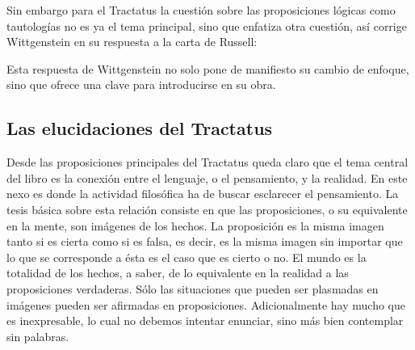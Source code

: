 Sin embargo para el Tractatus la cuestión sobre las proposiciones lógicas como
tautologías no es ya el tema principal, sino que enfatiza otra cuestión, así
corrige Wittgenstein en su respuesta a la carta de Russell:

Esta respuesta de Wittgenstein no solo pone de manifiesto su cambio de enfoque,
sino que ofrece una clave para introducirse en su obra. 


\subsection{Las elucidaciones del Tractatus}
Desde las proposiciones principales del Tractatus queda claro que el tema
central del libro es la conexión entre el lenguaje, o el pensamiento, y la
realidad.  
En este nexo es donde la actividad filosófica ha de buscar esclarecer el
pensamiento.
La tesis básica sobre esta relación consiste en que las proposiciones, o su
equivalente en la mente, son imágenes de los hechos.
La proposición es la misma imagen tanto si es cierta como si es falsa, es decir,
es la misma imagen sin importar que lo que se corresponde a ésta es el caso que
es cierto o no. El mundo es la totalidad de los hechos, a saber, de lo
equivalente en la realidad a las proposiciones verdaderas.
Sólo las situaciones que pueden ser plasmadas en imágenes pueden ser afirmadas
en proposiciones. Adicionalmente hay mucho que es inexpresable, lo cual no
debemos intentar enunciar, sino más bien contemplar sin palabras.\autocite[cf.
p.19]{anscombe1959iwt}

